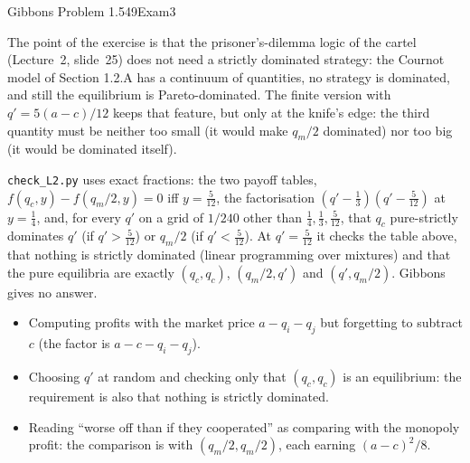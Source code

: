 \begin{exsol}{Gibbons Problem 1.5}{49}{Exam}{3}

\interp The point of the exercise is that the prisoner's-dilemma logic of the cartel (Lecture~2,
slide~25) does not need a strictly dominated strategy: the Cournot model of Section 1.2.A has a continuum of quantities,
no strategy is dominated, and still the equilibrium is Pareto-dominated. The finite version with
$q' = 5(a-c)/12$ keeps that feature, but only at the knife's edge: the third quantity must be neither too
small (it would make $q_m/2$ dominated) nor too big (it would be dominated itself).

\verify \texttt{check\_L2.py} uses exact fractions: the two payoff tables, $f(q_c,y) - f(q_m/2,y) = 0$ iff
$y = \tfrac5{12}$, the factorisation $(q'-\tfrac13)(q'-\tfrac5{12})$ at $y = \tfrac14$, and, for every $q'$ on a
grid of $1/240$ other than $\tfrac14, \tfrac13, \tfrac5{12}$, that $q_c$ pure-strictly dominates $q'$ (if $q' > \tfrac5{12}$) or
$q_m/2$ (if $q' < \tfrac5{12}$). At $q' = \tfrac5{12}$ it checks the table above, that nothing is strictly
dominated (linear programming over mixtures) and that the pure equilibria are exactly
$(q_c,q_c)$, $(q_m/2, q')$ and $(q', q_m/2)$. Gibbons gives no answer.

\mistakes
\begin{itemize}
  \item Computing profits with the market price $a - q_i - q_j$ but forgetting to subtract $c$ (the
  factor is $a - c - q_i - q_j$).
  \item Choosing $q'$ at random and checking only that $(q_c, q_c)$ is an equilibrium: the
  requirement is also that nothing is strictly dominated.
  \item Reading ``worse off than if they cooperated'' as comparing with the monopoly profit: the
  comparison is with $(q_m/2, q_m/2)$, each earning $(a-c)^2/8$.
\end{itemize}
\end{exsol}
